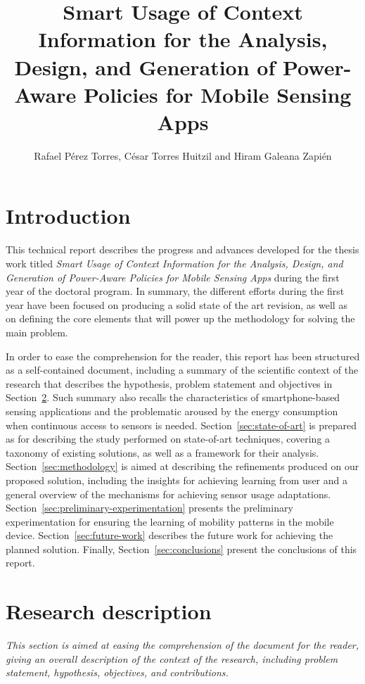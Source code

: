 \documentclass[ENG,PhD]{cinvestav}
\title{Smart Usage of Context Information for the Analysis, Design, and Generation of Power-Aware Policies for Mobile Sensing Apps}
\author{Rafael Pérez Torres, César Torres Huitzil and Hiram Galeana Zapién}
\begin{document}
\makeintropages



\section{Introduction}
\label{sec:introduction}
This technical report describes the progress and advances developed for the thesis work titled \emph{Smart Usage of Context Information for the Analysis, Design, and Generation of Power-Aware Policies for Mobile Sensing Apps} during the first year of the doctoral program.
In summary, the different efforts during the first year have been focused on producing a solid state of the art revision, as well as on defining the core elements that will power up the methodology for solving the main problem.

In order to ease the comprehension for the reader, this report has been structured as a self-contained document, including a summary of the scientific context of the research that describes the hypothesis, problem statement and objectives in Section~\ref{sub:research-context}.
Such summary also recalls the characteristics of smartphone-based sensing applications and the problematic aroused by the energy consumption when continuous access to sensors is needed.
Section~\ref{sec:state-of-art} is prepared as for describing the study performed on state-of-art techniques, covering a taxonomy of existing solutions, as well as a framework for their analysis.
Section~\ref{sec:methodology} is aimed at describing the refinements produced on our proposed solution, including the insights for achieving learning from user and a general overview of the mechanisms for achieving sensor usage adaptations.
Section~\ref{sec:preliminary-experimentation} presents the preliminary experimentation for ensuring the learning of mobility patterns in the mobile device.
Section~\ref{sec:future-work} describes the future work for achieving the planned solution.
Finally, Section~\ref{sec:conclusions} present the conclusions of this report.










\section{Research description}
\label{sub:research-context}
\emph{This section is aimed at easing the comprehension of the document for the reader, giving an overall description of the context of the research, including problem statement, hypothesis, objectives, and contributions.}
\end{document}
